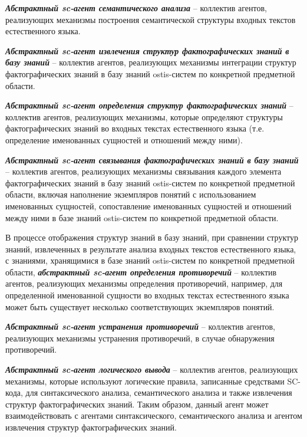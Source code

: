 \textit{\textbf{Абстрактный sc-агент семантического анализа}} -- коллектив агентов, реализующих механизмы построения семантической структуры входных текстов естественного языка.

\textit{\textbf{Абстрактный sc-агент извлечения структур фактографических знаний в базу знаний}} -- коллектив агентов, реализующих механизмы интеграции структур фактографических знаний в базу знаний ostis-систем по конкретной предметной области.

\textit{\textbf{Абстрактный sc-агент определения структур фактографических знаний}} -- коллектив агентов, реализующих механизмы, которые определяют структуры фактографических знаний во входных текстах естественного языка (т.е. определение именованных сущностей и отношений между ними).

\textit{\textbf{Абстрактный sc-агент связывания фактографических знаний в базу знаний}} -- коллектив агентов, реализующих механизмы связывания каждого элемента фактографических знаний в базу знаний ostis-систем по конкретной предметной области, включая наполнение экземпляров понятий с использованием именованных сущностей, сопоставление именованных сущностей и отношений между ними в базе знаний ostis-систем по конкретной предметной области.

В процессе отображения структур знаний в базу знаний, при сравнении структур знаний, извлеченных в результате анализа входных текстов естественного языка, с знаниями, хранящимися в базе знаний ostis-систем по конкретной предметной области, \textit{\textbf{абстрактный sc-агент определения противоречий}} -- коллектив агентов, реализующих механизмы определения противоречий, например, для определенной именованной сущности во входных текстах естественного языка может быть существует несколько соответствующих экземпляров понятий. 

\textit{\textbf{Абстрактный sc-агент устранения противоречий}} -- коллектив агентов, реализующих механизмы устранения противоречий, в случае обнаружения противоречий. 

\textit{\textbf{Абстрактный sc-агент логического вывода}} -- коллектив агентов, реализующих механизмы, которые используют логические правила, записанные средствами SC-кода, для синтаксического анализа, семантического анализа и также извлечения структур фактографических знаний. Таким образом, данный агент может взаимодействовать с агентами синтаксического, семантического анализа и агентом извлечения структур фактографических знаний.

